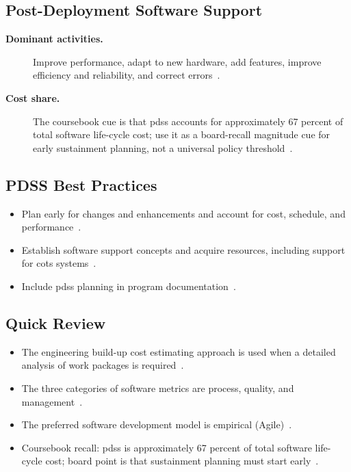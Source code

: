 \documentclass[../main.tex]{subfiles}
\begin{document}
\subsection{Post-Deployment Software Support}
\begin{description}
  \item[\textbf{Dominant activities.}] Improve performance, adapt to new hardware, add features, improve efficiency and reliability, and correct errors~\autocite{edo-3-4-2-software-acquisition-management-2025}.
  \item[\textbf{Cost share.}] The coursebook cue is that \ac{pdss} accounts for approximately 67 percent of total software life-cycle cost; use it as a board-recall magnitude cue for early sustainment planning, not a universal policy threshold~\autocite{edo-3-4-2-software-acquisition-management-2025}.
\end{description}

\subsection{PDSS Best Practices}
\begin{itemize}
  \item Plan early for changes and enhancements and account for cost, schedule, and performance~\autocite{edo-3-4-2-software-acquisition-management-2025}.
  \item Establish software support concepts and acquire resources, including support for \ac{cots} systems~\autocite{edo-3-4-2-software-acquisition-management-2025}.
  \item Include \ac{pdss} planning in program documentation~\autocite{edo-3-4-2-software-acquisition-management-2025}.
\end{itemize}

\subsection{Quick Review}
\begin{itemize}
  \item The engineering build-up cost estimating approach is used when a detailed analysis of work packages is required~\autocite{edo-3-4-2-software-acquisition-management-2025}.
  \item The three categories of software metrics are process, quality, and management~\autocite{edo-3-4-2-software-acquisition-management-2025}.
  \item The preferred software development model is empirical (Agile)~\autocite{edo-3-4-2-software-acquisition-management-2025}.
  \item Coursebook recall: \ac{pdss} is approximately 67 percent of total software life-cycle cost; board point is that sustainment planning must start early~\autocite{edo-3-4-2-software-acquisition-management-2025}.
\end{itemize}

\end{document}
